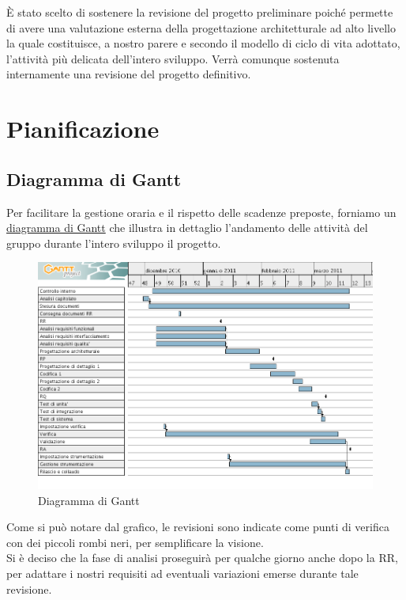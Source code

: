 \`E stato scelto di sostenere la revisione del progetto preliminare poich\'e
permette di avere una valutazione esterna della progettazione architetturale ad
alto livello la quale costituisce, a nostro parere e secondo il modello di ciclo
di vita adottato, l'attivit\`a pi\`u delicata dell'intero sviluppo.
Verr\`a comunque sostenuta internamente una revisione del progetto definitivo.

\chapter{Pianificazione}
\thispagestyle{fancy}

\section{Diagramma di Gantt}
Per facilitare la gestione oraria e il rispetto delle scadenze preposte,
forniamo un \underline{diagramma di Gantt} che illustra in dettaglio l'andamento
delle attivit\`a del gruppo durante l'intero sviluppo il progetto.
\vspace{0.8cm}
\begin{figure}[htbp]
  \centering
  \includegraphics[width=17.2cm, angle=0]{img/PP/gantt1.png}
\caption{Diagramma di Gantt}
\end{figure}
\newpage

Come si pu\`o notare dal grafico, le revisioni sono indicate come punti di 
verifica con dei piccoli rombi neri, per semplificare la visione.\\
Si \`e deciso che la fase di analisi proseguir\`a per qualche giorno anche dopo
la RR, per adattare i nostri requisiti ad eventuali variazioni emerse durante
tale revisione.\\

